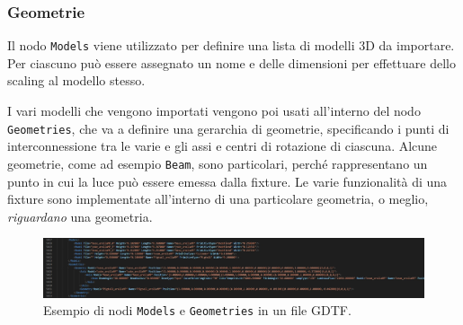 \documentclass[main.tex]{subfiles}
\begin{document}
\subsubsection{Geometrie}\label{subsec:1_2_geometries}
Il nodo \lstinline{Models} viene utilizzato per definire una lista di modelli 3D da importare. Per ciascuno può essere assegnato un nome e delle dimensioni per effettuare dello scaling al modello stesso. 

I vari modelli che vengono importati vengono poi usati all'interno del nodo \lstinline{Geometries}, che va a definire una gerarchia di geometrie, specificando i punti di interconnessione tra le varie e gli assi e centri di rotazione di ciascuna. Alcune geometrie, come ad esempio \lstinline{Beam}, sono particolari, perché rappresentano un punto in cui la luce può essere emessa dalla fixture.\newline
Le varie funzionalità di una fixture sono implementate all'interno di una particolare geometria, o meglio, \textit{riguardano} una geometria.
\begin{figure}[H]
    \centering
    \includegraphics[width=1\linewidth]{img/introduzione/GDTFgeometriesExample.jpg}
    \caption{Esempio di nodi \lstinline{Models} e \lstinline{Geometries} in un file GDTF.}
    \label{fig:1_gdtfGeometriesExample}
\end{figure}
\end{document}
